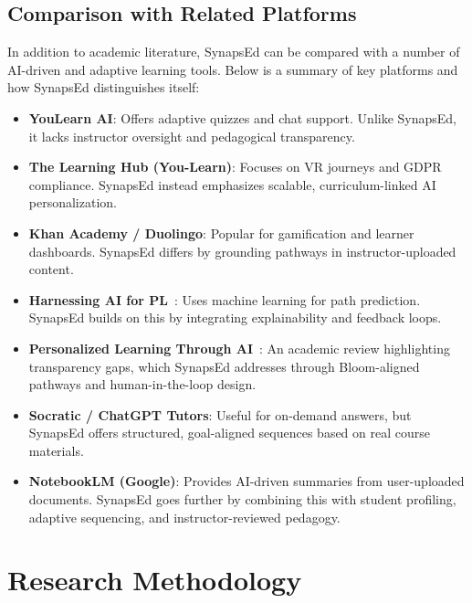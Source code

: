 \documentclass{stylefiles/capstone}
\begin{document}
\subsection*{Comparison with Related Platforms}

In addition to academic literature, SynapsEd can be compared with a number of AI-driven and adaptive learning tools. Below is a summary of key platforms and how SynapsEd distinguishes itself:

\begin{itemize}
  \item \textbf{YouLearn AI}: Offers adaptive quizzes and chat support. Unlike SynapsEd, it lacks instructor oversight and pedagogical transparency.
  
  \item \textbf{The Learning Hub (You-Learn)}: Focuses on VR journeys and GDPR compliance. SynapsEd instead emphasizes scalable, curriculum-linked AI personalization.
  
  \item \textbf{Khan Academy / Duolingo}: Popular for gamification and learner dashboards. SynapsEd differs by grounding pathways in instructor-uploaded content.
  
  \item \textbf{Harnessing AI for PL}~\cite{castro2024harnessing}: Uses machine learning for path prediction. SynapsEd builds on this by integrating explainability and feedback loops.
  
  \item \textbf{Personalized Learning Through AI}~\cite{vorobyeva2025personalized}: An academic review highlighting transparency gaps, which SynapsEd addresses through Bloom-aligned pathways and human-in-the-loop design.
  
  \item \textbf{Socratic / ChatGPT Tutors}: Useful for on-demand answers, but SynapsEd offers structured, goal-aligned sequences based on real course materials.
  
  \item \textbf{NotebookLM (Google)}: Provides AI-driven summaries from user-uploaded documents. SynapsEd goes further by combining this with student profiling, adaptive sequencing, and instructor-reviewed pedagogy.
\end{itemize}


\section{Research Methodology}
\end{document}
